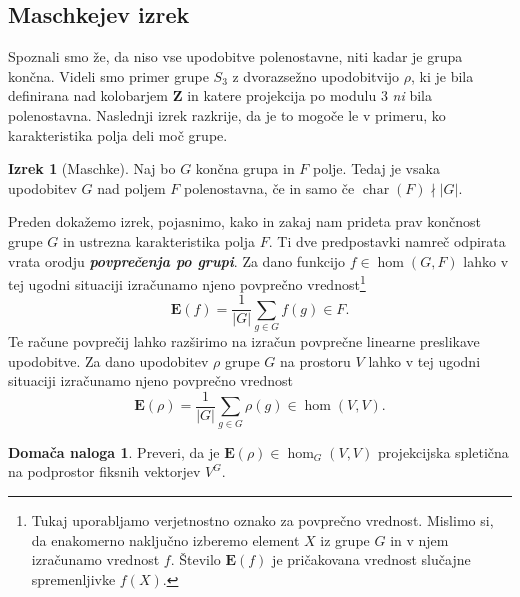 \documentclass[11pt]{book}
\def\ZZ{\mathbf{Z}}
\def\EE{\mathbf{E}}
\DeclareMathOperator\characteristic{char}
\def\definicija{\color{rdeca}\bf\em}
\theoremstyle{definition}
\theoremstyle{zgled}
\theoremstyle{odprtproblem}
\theoremstyle{domacanaloga}
\newtheorem*{domacanaloga}{Domača naloga}
\theoremstyle{izrek}
\newtheorem*{izrek}{Izrek}
\begin{document}
\subsection{Maschkejev izrek}

Spoznali smo že, da niso vse upodobitve polenostavne, niti kadar je grupa končna. Videli smo primer grupe $S_3$ z dvorazsežno upodobitvijo $\rho$, ki je bila definirana nad kolobarjem $\ZZ$ in katere projekcija po modulu $3$ \emph{ni} bila polenostavna. Naslednji izrek razkrije, da je to mogoče le v primeru, ko karakteristika polja deli moč grupe.

\begin{izrek}[Maschke]
Naj bo $G$ končna grupa in $F$ polje. Tedaj je vsaka upodobitev $G$ nad poljem $F$ polenostavna, če in samo če $\characteristic(F) \nmid |G|$.
\end{izrek}

Preden dokažemo izrek, pojasnimo, kako in zakaj nam prideta prav končnost grupe $G$ in ustrezna karakteristika polja $F$. Ti dve predpostavki namreč odpirata vrata orodju {\definicija povprečenja po grupi}. Za dano funkcijo $f \in \hom(G,F)$ lahko v tej ugodni situaciji izračunamo njeno povprečno vrednost\footnote{Tukaj uporabljamo verjetnostno oznako za povprečno vrednost. Mislimo si, da enakomerno naključno izberemo element $X$ iz grupe $G$ in v njem izračunamo vrednost $f$. Število $\EE(f)$ je pričakovana vrednost slučajne spremenljivke $f(X)$.}
\[
    \EE(f) = \frac{1}{|G|} \sum_{g \in G} f(g) \in F.
\]
Te račune povprečij lahko razširimo na izračun povprečne linearne preslikave upodobitve. Za dano upodobitev $\rho$ grupe $G$ na prostoru $V$ lahko v tej ugodni situaciji izračunamo njeno povprečno vrednost
\[
    \EE(\rho) = \frac{1}{|G|} \sum_{g \in G} \rho(g) \in \hom(V,V).
\]

\begin{domacanaloga}
Preveri, da je $\EE(\rho) \in \hom_G(V,V)$ projekcijska spletična na podprostor fiksnih vektorjev $V^G$. 
\end{domacanaloga}
\end{document}
